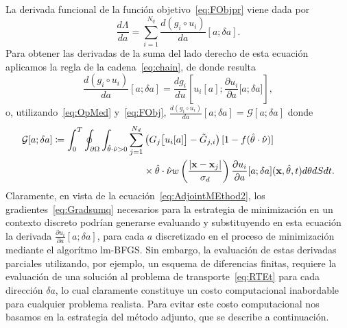 La derivada funcional de la función objetivo~\eqref{eq:FObjpr} viene 
dada por
\begin{equation}
  \frac{d \Lambda}{da} = \sum_{i=1}^{N_q} \frac{d (g_i\circ
    u_i)}{da}[a;\delta a].
\label{eq:Gradsumq}
\end{equation}
Para obtener las derivadas de la suma del lado derecho 
de esta ecuación aplicamos la regla de la cadena~\eqref{eq:chain}, 
de donde resulta  
\begin{equation}
\frac{d (g_i\circ u_i)}{da}[a;\delta a] = \frac{d g_i}{
    d u}\left[u_i[a];\frac{\partial u_i}{\partial a} \big[a;\delta
    a\big]\right],
  \label{eq:AdjointMEthod}
\end{equation} 
o, utilizando~\eqref{eq:OpMed} y~\eqref{eq:FObj}, $\frac{d (g_i\circ u_i)}{da}[a;\delta a]=\mathcal{G}[a;\delta a]$ donde
\begin{equation}
\begin{split}
\begin{aligned}
  \mathcal{G}[a;\delta a]\coloneqq 
  \int_0^T \oint_{\partial \Omega} \int_{\hat{\theta} \cdot \hat{\nu}>0}
  \sum_{j=1}^{N_d} &\left( G_j\big[u_i[a]\big]-
    \tilde {G}_{j,i} \right) [1-f(\hat{\theta} \cdot \hat{\nu})]\\ 
   &\times \hat{\theta} \cdot \hat{\nu} w\left( \frac{ |\mathbf{x}-\mathbf{x}_j |}{\sigma_d}
  \right) \frac{\partial u_i}{\partial a}[a;\delta a](\mathbf{x},\hat{\theta},t)
  d\theta dS dt.
\end{aligned}
\end{split}
\label{eq:AdjointMEthod2}
\end{equation}
Claramente, en vista de la ecuación~\eqref{eq:AdjointMEthod2}, 
los gradientes~\eqref{eq:Gradsumq} necesarios para la estrategia 
de minimización en un contexto discreto podrían generarse 
evaluando y substituyendo en esta ecuación la derivada 
$\frac{\partial u_i}{\partial a}[a;\delta a]$, para cada $a$ 
discretizado en el proceso de minimización mediante el algorítmo lm-BFGS. 
Sin embargo, la evaluación de estas derivadas parciales utilizando, 
por ejemplo, un esquema de diferencias finitas, requiere la evaluación 
de una solución al problema de transporte~\eqref{eq:RTEt} para 
cada dirección $\delta a$, lo cual claramente constituye 
un costo computacional inabordable para cualquier problema realista. 
Para evitar este costo computacional nos basamos en la 
estrategia del método adjunto, que se describe a continuación.

